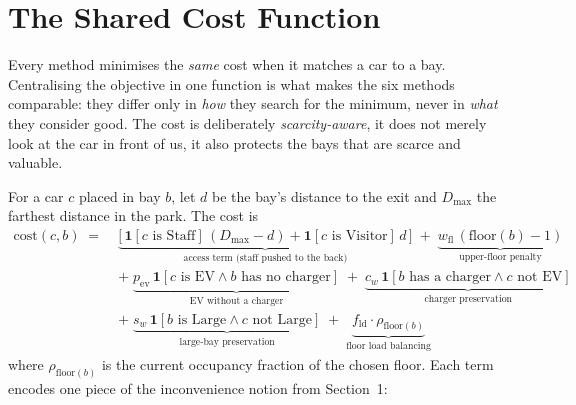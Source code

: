 \documentclass[11pt,a4paper]{article}
\begin{document}
\section{The Shared Cost Function}
\label{sec:cost}

Every method minimises the \emph{same} cost when it matches a car to a bay. Centralising
the objective in one function is what makes the six methods comparable: they differ only
in \emph{how} they search for the minimum, never in \emph{what} they consider good. The
cost is deliberately \emph{scarcity-aware}, it does not merely look at the car in
front of us, it also protects the bays that are scarce and valuable.

For a car $c$ placed in bay $b$, let $d$ be the bay's distance to the exit and
$D_{\max}$ the farthest distance in the park. The cost is
\begin{equation}
\label{eq:cost}
\begin{aligned}
\mathrm{cost}(c,b) \;=\;
&\underbrace{\Big[\,\mathbf{1}[c\text{ is Staff}]\,(D_{\max}-d) + \mathbf{1}[c\text{ is Visitor}]\,d\,\Big]}_{\text{access term (staff pushed to the back)}}
\;+\; \underbrace{w_{\text{fl}}\,(\mathrm{floor}(b)-1)}_{\text{upper-floor penalty}} \\[4pt]
&+\; \underbrace{p_{\text{ev}}\,\mathbf{1}[c\text{ is EV} \wedge b\text{ has no charger}]}_{\text{EV without a charger}}
\;+\; \underbrace{c_w\,\mathbf{1}[b\text{ has a charger} \wedge c\text{ not EV}]}_{\text{charger preservation}} \\[4pt]
&+\; \underbrace{s_w\,\mathbf{1}[b\text{ is Large} \wedge c\text{ not Large}]}_{\text{large-bay preservation}}
\;+\; \underbrace{f_{\text{ld}}\cdot \rho_{\mathrm{floor}(b)}}_{\text{floor load balancing}}
\end{aligned}
\end{equation}
where $\rho_{\mathrm{floor}(b)}$ is the current occupancy fraction of the chosen floor.
Each term encodes one piece of the inconvenience notion from Section~1:
\end{document}
